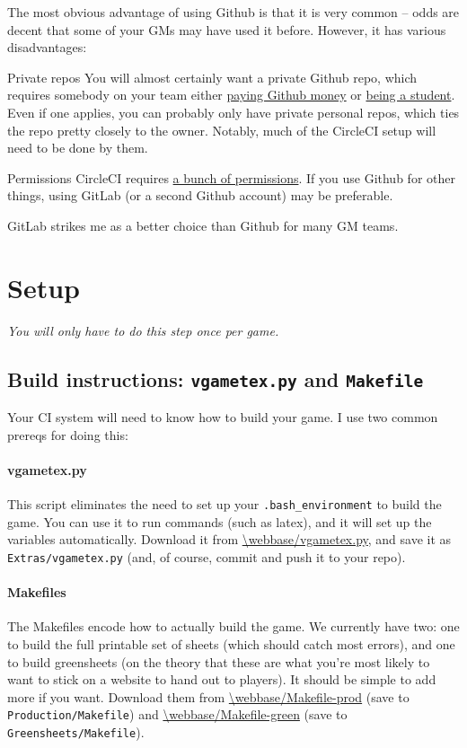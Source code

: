 \documentclass[green]{testgame}
\begin{document}
The most obvious advantage of using Github is that it is very common -- odds are decent that some of your GMs may have used it before. However, it has various disadvantages:
\begin{desc}
    \item[Private repos] You will almost certainly want a private Github repo, which requires somebody on your team either \href{https://github.com/pricing}{paying Github money} or \href{https://education.github.com/pack}{being a student}. Even if one applies, you can probably only have private personal repos, which ties the repo pretty closely to the owner. Notably, much of the CircleCI setup will need to be done by them.
    \item[Permissions] CircleCI requires \href{https://circleci.com/docs/github-permissions/}{a bunch of permissions}. If you use Github for other things, using GitLab (or a second Github account) may be preferable.
\end{desc}

GitLab strikes me as a better choice than Github for many GM teams.

\section{Setup}

\emph{You will only have to do this step once per game.}

\subsection{Build instructions: \texttt{vgametex.py} and \texttt{Makefile}}

Your CI system will need to know how to build your game. I use two common prereqs for doing this:

\paragraph*{vgametex.py} This script eliminates the need to set up your \texttt{.bash\_environment} to build the game. You can use it to run commands (such as latex), and it will set up the \GameTeX{} variables automatically. Download it from \url{\webbase/vgametex.py}, and save it as \texttt{Extras/vgametex.py} (and, of course, commit and push it to your repo).

\paragraph*{Makefiles} The Makefiles encode how to actually build the game. We currently have two: one to build the full printable set of sheets (which should catch most errors), and one to build greensheets (on the theory that these are what you're most likely to want to stick on a website to hand out to players). It should be simple to add more if you want. Download them from \url{\webbase/Makefile-prod} (save to \texttt{Production/Makefile}) and \url{\webbase/Makefile-green} (save to \texttt{Greensheets/Makefile}).
\end{document}
